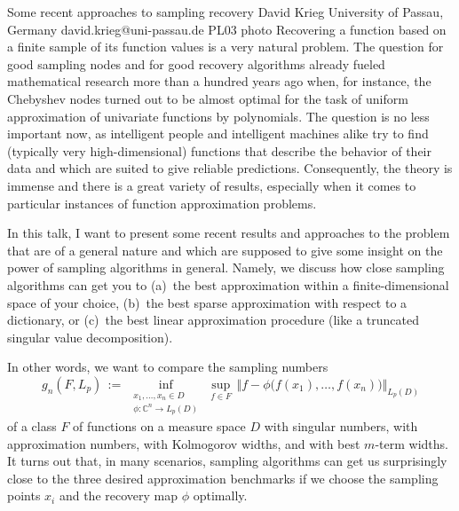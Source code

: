 \documentclass[12pt,a4paper,figuresright]{book}
\begin{document}
\begin{talkcr}
	{Some recent approaches to sampling recovery}%
	{David Krieg}%
	{University of Passau, Germany}%
	{david.krieg@uni-passau.de}%
	{}%
	{}%
	{}%
	{PL03}%
	{photo}%
	Recovering a function based on a finite sample of its function values is a very natural problem.
The question for good sampling nodes and for good recovery algorithms 
already fueled mathematical research 
more than a hundred years ago
when, for instance, the Chebyshev nodes turned out to be almost optimal
for the task of uniform approximation of univariate functions by polynomials. 
The question is no less important now, as intelligent people and intelligent machines alike try to find (typically very high-dimensional) functions that describe the behavior of their data and which are suited to give reliable predictions. 
Consequently, the theory is immense and there is a great variety of results, especially when it comes to particular instances of function approximation problems.

In this talk, I want to present some recent results and approaches to the problem that are of a general nature and which are supposed to give some insight on the power of sampling algorithms in general. 
Namely, we discuss how close sampling algorithms can get you
to (a)~the best approximation within a finite-dimensional space of your choice,
(b)~the best sparse approximation with respect to a dictionary,
or (c)~the best linear approximation procedure (like a truncated singular value decomposition).

In other words, 
we want to compare the sampling numbers 
\[
 g_n(F,L_p) \,:=\, \inf_{\substack{x_1,\hdots,x_n\in D \\ \phi\colon \mathbb{C}^n \to L_p(D)}}
 \,\sup_{f\in F}\, \big\Vert f - \phi\big( f(x_1),\dots,f(x_n)\big)\big\Vert_{L_p(D)}
\]
of a class $F$ of functions on a measure space $D$ 
with singular numbers, with approximation numbers, with Kolmogorov widths, and with best $m$-term widths. 
It turns out that, in many scenarios, sampling algorithms 
can get us surprisingly close to the three desired approximation benchmarks 
if we choose the sampling points $x_i$ and the recovery map $\phi$ optimally.
\end{talkcr}

\clearpage
\end{document}
